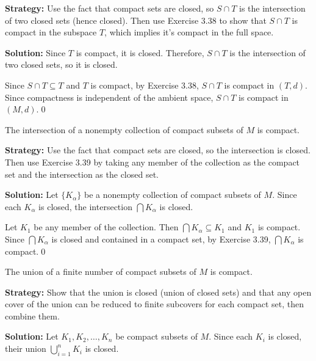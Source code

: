 \noindent\textbf{Strategy:} Use the fact that compact sets are closed, so $S \cap T$ is the intersection of two closed sets (hence closed). Then use Exercise 3.38 to show that $S \cap T$ is compact in the subspace $T$, which implies it's compact in the full space.

\bigskip\noindent\textbf{Solution:} Since $T$ is compact, it is closed. Therefore, $S \cap T$ is the intersection of two closed sets, so it is closed.

Since $S \cap T \subseteq T$ and $T$ is compact, by Exercise 3.38, $S \cap T$ is compact in $(T,d)$. Since compactness is independent of the ambient space, $S \cap T$ is compact in $(M,d)$.\qed


\begin{problembox}
\begin{problemstatement}
The intersection of a nonempty collection of compact subsets of \( M \) is compact.
\end{problemstatement}
\end{problembox}

\noindent\textbf{Strategy:} Use the fact that compact sets are closed, so the intersection is closed. Then use Exercise 3.39 by taking any member of the collection as the compact set and the intersection as the closed set.

\bigskip\noindent\textbf{Solution:} Let $\{K_\alpha\}$ be a nonempty collection of compact subsets of $M$. Since each $K_\alpha$ is closed, the intersection $\bigcap K_\alpha$ is closed.

Let $K_1$ be any member of the collection. Then $\bigcap K_\alpha \subseteq K_1$ and $K_1$ is compact. Since $\bigcap K_\alpha$ is closed and contained in a compact set, by Exercise 3.39, $\bigcap K_\alpha$ is compact.\qed


\begin{problembox}
\begin{problemstatement}
The union of a finite number of compact subsets of \( M \) is compact.
\end{problemstatement}
\end{problembox}

\noindent\textbf{Strategy:} Show that the union is closed (union of closed sets) and that any open cover of the union can be reduced to finite subcovers for each compact set, then combine them.

\bigskip\noindent\textbf{Solution:} Let $K_1, K_2, \ldots, K_n$ be compact subsets of $M$. Since each $K_i$ is closed, their union $\bigcup_{i=1}^n K_i$ is closed.

